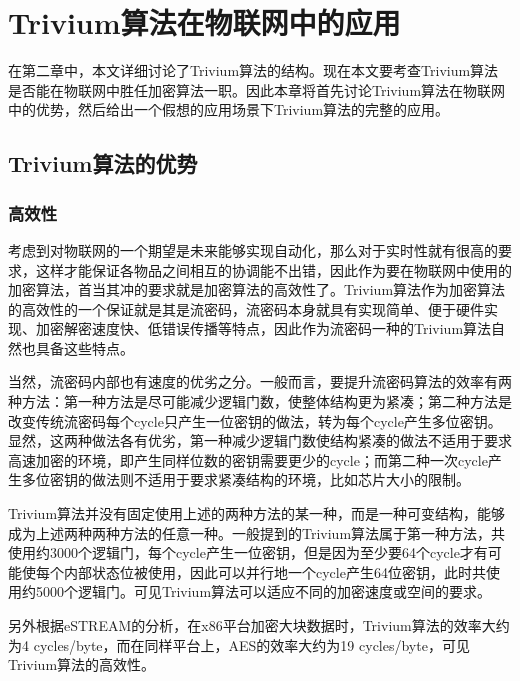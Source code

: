
\chapter{Trivium算法在物联网中的应用}
\label{chap:use}

在第二章中，本文详细讨论了Trivium算法的结构。现在本文要考查Trivium算法是否能在物联网中胜任加密算法一职。因此本章将首先讨论Trivium算法在物联网中的优势，然后给出一个假想的应用场景下Trivium算法的完整的应用。

\section{Trivium算法的优势}
\label{sec:advantage}

\subsection{高效性}

考虑到对物联网的一个期望是未来能够实现自动化，那么对于实时性就有很高的要求，这样才能保证各物品之间相互的协调能不出错，因此作为要在物联网中使用的加密算法，首当其冲的要求就是加密算法的高效性了。Trivium算法作为加密算法的高效性的一个保证就是其是流密码，流密码本身就具有实现简单、便于硬件实现、加密解密速度快、低错误传播等特点，因此作为流密码一种的Trivium算法自然也具备这些特点。

当然，流密码内部也有速度的优劣之分。一般而言，要提升流密码算法的效率有两种方法：第一种方法是尽可能减少逻辑门数，使整体结构更为紧凑；第二种方法是改变传统流密码每个cycle只产生一位密钥的做法，转为每个cycle产生多位密钥。显然，这两种做法各有优劣，第一种减少逻辑门数使结构紧凑的做法不适用于要求高速加密的环境，即产生同样位数的密钥需要更少的cycle；而第二种一次cycle产生多位密钥的做法则不适用于要求紧凑结构的环境，比如芯片大小的限制。

Trivium算法并没有固定使用上述的两种方法的某一种，而是一种可变结构，能够成为上述两种两种方法的任意一种。一般提到的Trivium算法属于第一种方法，共使用约3000个逻辑门，每个cycle产生一位密钥，但是因为至少要64个cycle才有可能使每个内部状态位被使用，因此可以并行地一个cycle产生64位密钥，此时共使用约5000个逻辑门。可见Trivium算法可以适应不同的加密速度或空间的要求。

另外根据eSTREAM的分析，在x86平台加密大块数据时，Trivium算法的效率大约为4 cycles/byte，而在同样平台上，AES的效率大约为19 cycles/byte，可见Trivium算法的高效性。

